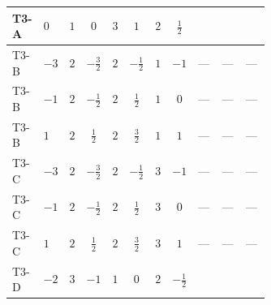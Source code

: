 \documentclass[8pt]{article}
\begin{document}
\begin{landscape}
\begin{longtable}{@{}llcccccc >{\raggedright\arraybackslash}p{0.21\linewidth} >{\raggedright\arraybackslash}p{0.21\linewidth} >{\raggedright\arraybackslash}p{0.21\linewidth}@{}}
\midrule
T3-A & $0$ & $1$ & $0$ & $3$ & $1$ & $2$ & $\frac{1}{2}$ & \scriptsize\adjustbox{max width=\linewidth}{$\begin{gathered} \frac{1}{4} (2 \left(\left({y_1}\right)^{T}\,\left({y_1}\right)^{*}\,{M_F}\right)_{ij}+3 \left({M_F}\,\left({y_2}\right)^{\dagger}\,{y_2}\right)_{ij})\end{gathered}$} & \scriptsize\adjustbox{max width=\linewidth}{$\begin{gathered} -\frac{9}{2} {g_2}^2 \left({M_F}\right)_{ij}\end{gathered}$} & \scriptsize\adjustbox{max width=\linewidth}{$\begin{gathered} -\frac{3}{2} {g_1}^2 \left({M_F}\right)_{ij}\end{gathered}$} \\
\midrule
T3-B & $-3$ & $2$ & $-\frac{3}{2}$ & $2$ & $-\frac{1}{2}$ & $1$ & $-1$ & --- & --- & --- \\
\midrule
T3-B & $-1$ & $2$ & $-\frac{1}{2}$ & $2$ & $\frac{1}{2}$ & $1$ & $0$ & --- & --- & --- \\
\midrule
T3-B & $1$ & $2$ & $\frac{1}{2}$ & $2$ & $\frac{3}{2}$ & $1$ & $1$ & --- & --- & --- \\
\midrule
T3-C & $-3$ & $2$ & $-\frac{3}{2}$ & $2$ & $-\frac{1}{2}$ & $3$ & $-1$ & --- & --- & --- \\
\midrule
T3-C & $-1$ & $2$ & $-\frac{1}{2}$ & $2$ & $\frac{1}{2}$ & $3$ & $0$ & --- & --- & --- \\
\midrule
T3-C & $1$ & $2$ & $\frac{1}{2}$ & $2$ & $\frac{3}{2}$ & $3$ & $1$ & --- & --- & --- \\
\midrule
T3-D & $-2$ & $3$ & $-1$ & $1$ & $0$ & $2$ & $-\frac{1}{2}$ & \scriptsize\adjustbox{max width=\linewidth}{$\begin{gathered} \frac{1}{4} (3 \left(\left({y_1}\right)^{T}\,\left({y_1}\right)^{*}\,{M_F}\right)_{ij}+2 \left({M_F}\,\left({y_2}\right)^{\dagger}\,{y_2}\right)_{ij})\end{gathered}$} & \scriptsize\adjustbox{max width=\linewidth}{$\begin{gathered} -\frac{9}{2} {g_2}^2 \left({M_F}\right)_{ij}\end{gathered}$} & \scriptsize\adjustbox{max width=\linewidth}{$\begin{gathered} -\frac{3}{2} {g_1}^2 \left({M_F}\right)_{ij}\end{gathered}$} \\
\midrule

\end{longtable}
\end{landscape}
\end{document}

